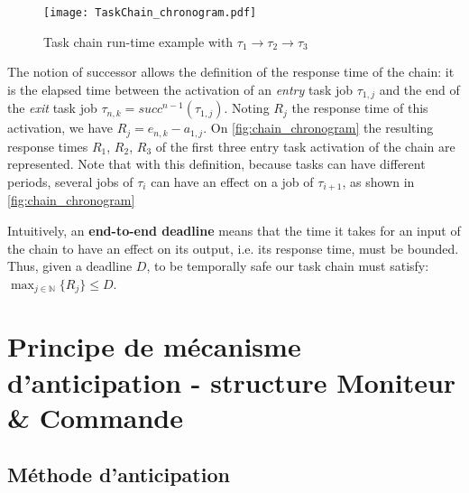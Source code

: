 \documentclass[french, a4paper, 11pt, twoside, pdftex]{StyleThese}
\begin{document}
    \begin{figure}[ht]
        \centering
        \texttt{[image: TaskChain\_chronogram.pdf]}
        \caption{Task chain run-time example with $\tau_1 \rightarrow \tau_2 \rightarrow \tau_3$}
        \label{fig:chain_chronogram}
    \end{figure}
        
    The notion of successor allows the definition of the response time of the chain: it is the elapsed time between the activation of an \emph{entry} task job $\tau_{1, j}$ and the end of the \emph{exit} task job $\tau_{n, k} = succ^{n-1}(\tau_{1, j})$. Noting $R_{j}$ the response time of this activation, we have $R_{j} = e_{n,k} - a_{1,j}$. On \autoref{fig:chain_chronogram} the resulting response times $R_1$, $R_2$, $R_3$ of the first three entry task activation of the chain are represented. 
    Note that with this definition, because tasks can have different periods, several jobs of $\tau_i$ can have an effect on a job of $\tau_{i+1}$, as shown in \autoref{fig:chain_chronogram} 

    Intuitively, an \textbf{end-to-end deadline} means that the time it takes for an input of the chain to have an effect on its output, i.e. its response time, must be bounded. Thus, given a deadline $D$, to be temporally safe our task chain must satisfy: $\max_{j \in \mathbb{N}}\{R_j\} \leq D$. 
    
\section{Principe de mécanisme d'anticipation - structure Moniteur \& Commande}
    \subsection{Méthode d'anticipation}
    
\end{document}

